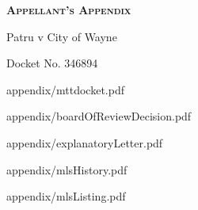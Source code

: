 \documentclass[12pt,\documentclassflag]{article}
\begin{document}

\begin{centering}
  \bf\scshape Appellant's Appendix\par%
  \rm Patru v City of Wayne\par%
  Docket No. 346894\par%
\end{centering}

\tableofcontents
\newpage
\renewcommand{\footrulewidth}{0.4pt}
\renewcommand{\subsectionmark}[1]{\markright{/#1}} %

\newcommand{\addLabelsToAllIncludedPages}[1]{%
   \refstepcounter{includepdfpage}%
   \stepcounter{currentpagecounter}%
   \label{#1.\thecurrentpagecounter}}%

\newcommand{\myincludepdf}[2]{%
  \setcounter{currentpagecounter}{0}%
  {appendix/#1.pdf}}%
  
\renewcommand{\sectionmark}[1]{\markboth{#1}{}}%
\myincludepdf{mttdocket}{1,section, 1, Tax Tribunal Docket}

\renewcommand{\sectionmark}[1]{\markboth{#1}{Board of Review Decision}}%
\myincludepdf{boardOfReviewDecision}{1,section,1,Board of Review Decision (docket line 2)}%

\renewcommand{\sectionmark}[1]{\markboth{#1}{/Explanatory Letter}}%
\myincludepdf{explanatoryLetter}{1,section,1,Appellant's Evidence,evidence,1,subsection,2,Explanatory Letter (docket line 38)}%

\renewcommand{\sectionmark}[1]{\markboth{#1}{/MLS History}}%
\myincludepdf{mlsHistory}{1,subsection,2,MLS History (docket line 33)}%

\renewcommand{\sectionmark}[1]{\markboth{#1}{/MLS Listing Sheet}}%
\myincludepdf{mlsListing}{1,subsection,2,MLS Listing Sheet (docket line 32)}%
\end{document}
